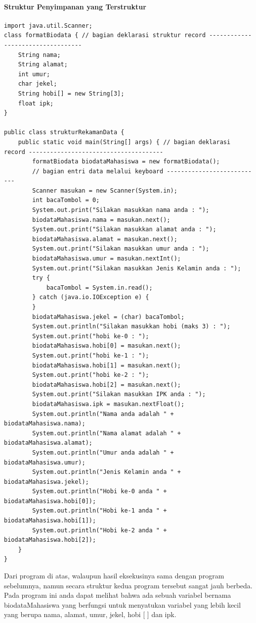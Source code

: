 \documentclass[a4paper,12pt]{article}
\begin{document}
\paragraph*{Struktur Penyimpanan yang Terstruktur\\}
\begin{lstlisting}
import java.util.Scanner;
class formatBiodata { // bagian deklarasi struktur record ----------------------------------
    String nama;
    String alamat;
    int umur;
    char jekel;
    String hobi[] = new String[3];
    float ipk;
}

public class strukturRekamanData {
    public static void main(String[] args) { // bagian deklarasi record --------------------------------------
        formatBiodata biodataMahasiswa = new formatBiodata();
        // bagian entri data melalui keyboard ---------------------------
        Scanner masukan = new Scanner(System.in);
        int bacaTombol = 0;
        System.out.print("Silakan masukkan nama anda : ");
        biodataMahasiswa.nama = masukan.next();
        System.out.print("Silakan masukkan alamat anda : ");
        biodataMahasiswa.alamat = masukan.next();
        System.out.print("Silakan masukkan umur anda : ");
        biodataMahasiswa.umur = masukan.nextInt();
        System.out.print("Silakan masukkan Jenis Kelamin anda : ");
        try {
            bacaTombol = System.in.read();
        } catch (java.io.IOException e) {
        }
        biodataMahasiswa.jekel = (char) bacaTombol;
        System.out.println("Silakan masukkan hobi (maks 3) : ");
        System.out.print("hobi ke-0 : ");
        biodataMahasiswa.hobi[0] = masukan.next();
        System.out.print("hobi ke-1 : ");
        biodataMahasiswa.hobi[1] = masukan.next();
        System.out.print("hobi ke-2 : ");
        biodataMahasiswa.hobi[2] = masukan.next();
        System.out.print("Silakan masukkan IPK anda : ");
        biodataMahasiswa.ipk = masukan.nextFloat();
        System.out.println("Nama anda adalah " + biodataMahasiswa.nama);
        System.out.println("Nama alamat adalah " + biodataMahasiswa.alamat);
        System.out.println("Umur anda adalah " + biodataMahasiswa.umur);
        System.out.println("Jenis Kelamin anda " + biodataMahasiswa.jekel);
        System.out.println("Hobi ke-0 anda " + biodataMahasiswa.hobi[0]);
        System.out.println("Hobi ke-1 anda " + biodataMahasiswa.hobi[1]);
        System.out.println("Hobi ke-2 anda " + biodataMahasiswa.hobi[2]);
    }
}
\end{lstlisting}
Dari program di atas, walaupun hasil eksekusinya sama dengan program sebelumnya, 
namun secara struktur kedua program tersebut sangat jauh berbeda. Pada program ini 
anda  dapat melihat bahwa ada sebuah variabel bernama  biodataMahasiswa yang 
berfungsi untuk menyatukan variabel yang lebih kecil yang berupa nama, alamat, umur, 
jekel, hobi [ ] dan ipk.\\ 
 
\end{document}
